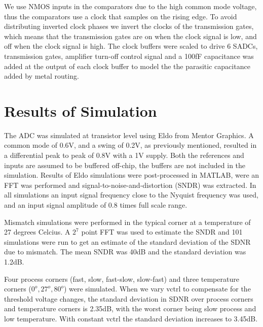 We use NMOS inputs in the comparators
due to the high common mode voltage, thus the comparators use a clock that
samples on the rising edge. To avoid distributing inverted clock
phases we invert the clocks of the transmission gates, which means that the
transmission gates are on when the clock signal is low, and off when
the clock signal is high. The clock buffers were scaled to drive 6 SADCs,
transmission gates, amplifier turn-off control signal and a 100fF
capacitance was added at the output of each clock buffer to model the the parasitic
capacitance added by metal routing.

\section{Results of Simulation}\label{p2results}
The ADC was simulated at transistor
level using Eldo from Mentor Graphics. A common mode of 0.6V, and a
swing of 0.2V, as previously mentioned, resulted in a differential
peak to peak of 0.8V with a 1V supply. Both the references and inputs are assumed to be
buffered off-chip, the buffers are not included in the simulation. Results of
Eldo simulations were post-processed in MATLAB, were an FFT was
performed and signal-to-noise-and-distortion (SNDR) was extracted.
In all simulations an input signal frequency close to the Nyquist frequency
was used, and an input signal amplitude of 0.8 times full scale range.

Mismatch simulations were performed in the typical corner at a
temperature of 27 degrees Celcius. A $2^7$ point FFT was used to estimate the
SNDR and 101 simulations were run to get an estimate of the standard
deviation of the SDNR due to mismatch. The mean SNDR was 40dB and the standard
deviation was 1.2dB. 

Four process corners (fast, slow, fast-slow, slow-fast) and three
temperature corners ($0^o, 27^o, 80^o$) were simulated. 
When we vary vctrl to compensate for the threshold voltage changes, the
standard deviation in SDNR over process corners and temperature
corners is 2.35dB, with the worst corner being slow process and low
temperature. With constant vctrl the standard deviation increases to 3.45dB.

